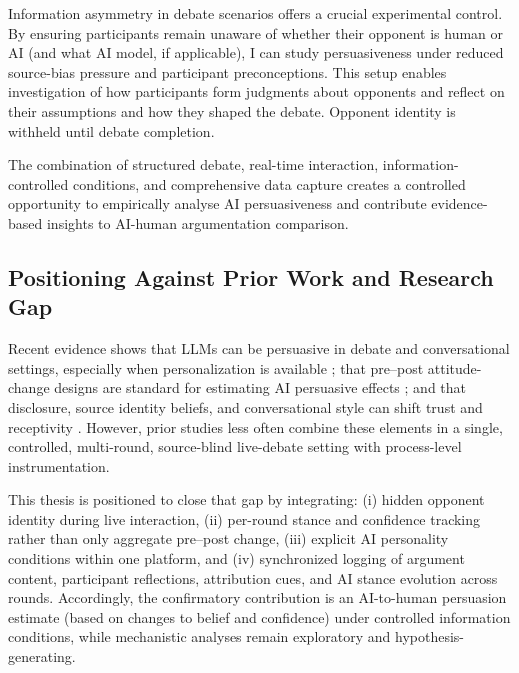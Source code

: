 Information asymmetry in debate scenarios offers a crucial experimental control. By ensuring
participants remain unaware of whether their opponent is human or AI (and what AI model, if
applicable), I can study persuasiveness under reduced source-bias pressure and participant
preconceptions. This setup enables investigation of how participants form judgments about
opponents and reflect on their assumptions and how they shaped the debate.
Opponent identity is withheld until debate completion.

The combination of structured debate, real-time interaction, information-controlled conditions,
and comprehensive data capture creates a controlled opportunity to empirically analyse AI
persuasiveness and contribute evidence-based insights to AI-human argumentation comparison.

\subsection{Positioning Against Prior Work and Research Gap}

Recent evidence shows that LLMs can be persuasive in debate and conversational settings,
especially when personalization is available \cite{salvi2025_chatgpt_debates,shi2020_effects_persuasive_dialogues_bots};
that pre--post attitude-change designs are standard for estimating AI persuasive effects
\cite{argyle2025_testing_political_persuasion,durmus2024_measuring_persuasiveness,pataranutaporn2025_oceanchat};
and that disclosure, source identity beliefs, and conversational style can shift trust and receptivity
\cite{schilke2025_transparency_dilemma,montag2023_trust_humans_vs_ai,schwede2023_can_chatbots_be_persuasive,heppner2024_chatbot_personality_cues}.
However, prior studies less often combine these elements in a single, controlled, multi-round,
source-blind live-debate setting with process-level instrumentation.

This thesis is positioned to close that gap by integrating: (i) hidden opponent identity during
live interaction, (ii) per-round stance and confidence tracking rather than only aggregate pre--post
change, (iii) explicit AI personality conditions within one platform, and (iv) synchronized logging of
argument content, participant reflections, attribution cues, and AI stance evolution across rounds.
Accordingly, the confirmatory contribution is an AI-to-human persuasion estimate (based on changes to belief
and confidence) under controlled information conditions, while mechanistic analyses remain exploratory
and hypothesis-generating.

